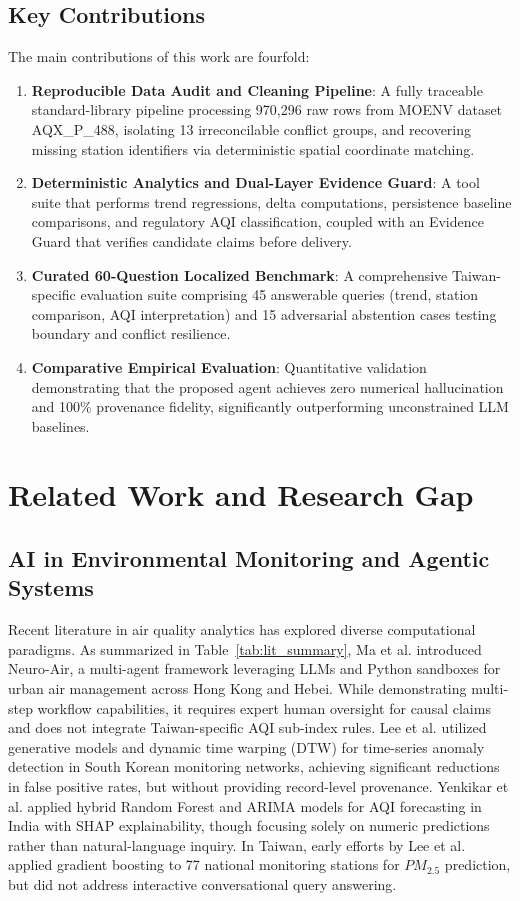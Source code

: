 \documentclass[conference]{IEEEtran}
\begin{document}
\subsection{Key Contributions}
The main contributions of this work are fourfold:
\begin{enumerate}
    \item \textbf{Reproducible Data Audit and Cleaning Pipeline}: A fully traceable standard-library pipeline processing 970,296 raw rows from MOENV dataset AQX\_P\_488, isolating 13 irreconcilable conflict groups, and recovering missing station identifiers via deterministic spatial coordinate matching.
    \item \textbf{Deterministic Analytics and Dual-Layer Evidence Guard}: A tool suite that performs trend regressions, delta computations, persistence baseline comparisons, and regulatory AQI classification, coupled with an Evidence Guard that verifies candidate claims before delivery.
    \item \textbf{Curated 60-Question Localized Benchmark}: A comprehensive Taiwan-specific evaluation suite comprising 45 answerable queries (trend, station comparison, AQI interpretation) and 15 adversarial abstention cases testing boundary and conflict resilience.
    \item \textbf{Comparative Empirical Evaluation}: Quantitative validation demonstrating that the proposed agent achieves zero numerical hallucination and 100\% provenance fidelity, significantly outperforming unconstrained LLM baselines.
\end{enumerate}

\section{Related Work and Research Gap}

\subsection{AI in Environmental Monitoring and Agentic Systems}
Recent literature in air quality analytics has explored diverse computational paradigms. As summarized in Table~\ref{tab:lit_summary}, Ma et al. \cite{ma2026multi} introduced Neuro-Air, a multi-agent framework leveraging LLMs and Python sandboxes for urban air management across Hong Kong and Hebei. While demonstrating multi-step workflow capabilities, it requires expert human oversight for causal claims and does not integrate Taiwan-specific AQI sub-index rules. Lee et al. \cite{lee2025anomaly} utilized generative models and dynamic time warping (DTW) for time-series anomaly detection in South Korean monitoring networks, achieving significant reductions in false positive rates, but without providing record-level provenance. Yenkikar et al. \cite{yenkikar2025explainable} applied hybrid Random Forest and ARIMA models for AQI forecasting in India with SHAP explainability, though focusing solely on numeric predictions rather than natural-language inquiry. In Taiwan, early efforts by Lee et al. \cite{lee2020forecasting} applied gradient boosting to 77 national monitoring stations for $PM_{2.5}$ prediction, but did not address interactive conversational query answering.
\end{document}

